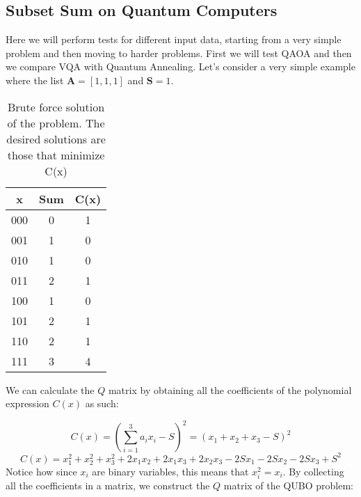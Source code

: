 \documentclass[12pt,a4paper]{report}
\begin{document}
\begin{center}
\end{center}

\newpage

\subsection{Subset Sum on Quantum Computers}

Here we will perform tests for different input data, starting from a very simple problem and then moving to harder problems. First we will test QAOA and then we compare VQA with Quantum Annealing. Let's consider a very simple example where the list \( \mathbf{A} = [1, 1, 1] \) and \( \mathbf{S} = 1 \).
\\

\begin{table}[h]
    \centering
    \begin{tabular}{|c|c|c|}
        \hline
        \textbf{x} & \textbf{Sum} & \textbf{C(x)} \\
        \hline
        000 & 0 & 1 \\
        001 & 1 & 0 \\
        010 & 1 & 0 \\
        011 & 2 & 1 \\
        100 & 1 & 0 \\
        101 & 2 & 1 \\
        110 & 2 & 1 \\
        111 & 3 & 4 \\
        \hline
    \end{tabular}
    \caption{Brute force solution of the problem. The desired solutions are those that minimize C(x)}
    \label{tab:subss_brute_force}
\end{table}

\noindent
We can calculate the \( Q \) matrix by obtaining all the coefficients of the polynomial expression \( C(x) \) as such:

\[
C(x) = \left(\sum_{i=1}^{3} a_ix_i - S\right)^2 = (x_1 + x_2 + x_3 - S)^2
\]
\[
C(x) = x_1^2 + x_2^2 + x_3^2 + 2x_1x_2 + 2x_1x_3 + 2x_2x_3 - 2Sx_1 - 2Sx_2 - 2Sx_3 + S^2
\]
\noindent
Notice how since \( x_i \) are binary variables, this means that \( x_i^2 = x_i \). By collecting all the coefficients in a matrix, we construct the \( Q \) matrix of the QUBO problem:
\end{document}
